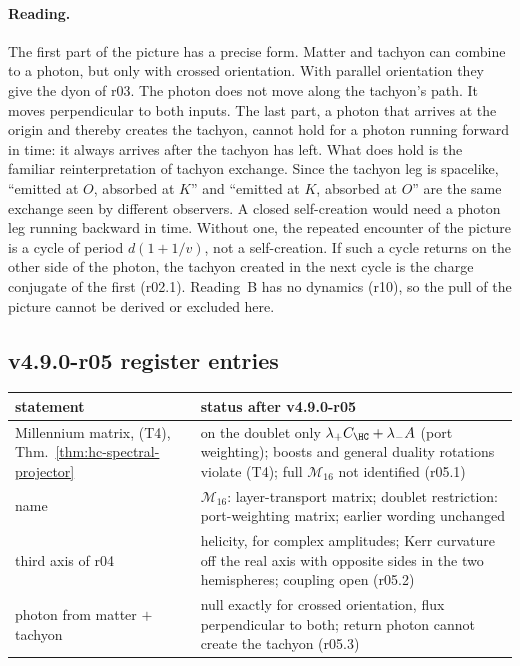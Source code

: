 \paragraph{Reading.}
The first part of the picture has a precise form.  Matter and tachyon can combine to a photon, but only with crossed
orientation.  With parallel orientation they give the dyon of r03.  The photon does not move along the tachyon's path.
It moves perpendicular to both inputs.  The last part, a photon that arrives at the origin and thereby creates the
tachyon, cannot hold for a photon running forward in time: it always arrives after the tachyon has left.  What does hold
is the familiar reinterpretation of tachyon exchange.  Since the tachyon leg is spacelike, ``emitted at \(O\), absorbed at
\(K\)'' and ``emitted at \(K\), absorbed at \(O\)'' are the same exchange seen by different observers.  A closed
self-creation would need a photon leg running backward in time.  Without one, the repeated encounter of the picture is a
cycle of period \(d(1+1/v)\), not a self-creation.  If such a cycle returns on the other side of the photon, the tachyon
created in the next cycle is the charge conjugate of the first (r02.1).  Reading~B has no dynamics (r10), so the pull of
the picture cannot be derived or excluded here.

\subsection*{v4.9.0-r05 register entries}
\label{subsec:v490-r05-register}

\begin{center}
\small
\begin{tabular}{@{}>{\raggedright\arraybackslash}p{}>{\raggedright\arraybackslash}p{}@{}}
\toprule
statement & status after v4.9.0-r05\\
\midrule
Millennium matrix, (T4), Thm.~\ref{thm:hc-spectral-projector} & on the doublet only \(\lambda_+C_{\HC}+\lambda_-A\) (port weighting); boosts and general duality rotations violate (T4); full \(\mathcal M_{16}\) not identified (r05.1)\\
name & \(\mathcal M_{16}\): layer-transport matrix; doublet restriction: port-weighting matrix; earlier wording unchanged\\
third axis of r04 & helicity, for complex amplitudes; Kerr curvature off the real axis with opposite sides in the two hemispheres; coupling open (r05.2)\\
photon from matter \(+\) tachyon & null exactly for crossed orientation, flux perpendicular to both; return photon cannot create the tachyon (r05.3)\\
\bottomrule
\end{tabular}
\end{center}


